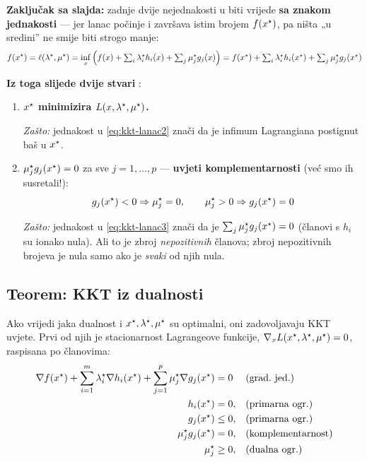 \textbf{Zaključak sa slajda:} zadnje dvije nejednakosti u biti vrijede
\textbf{sa znakom jednakosti} --- jer lanac počinje i završava istim brojem
$f(x^{\star})$, pa ništa „u sredini” ne smije biti strogo manje:
\[
f(x^{\star}) = \ell(\lambda^{\star},\mu^{\star})
= \inf_x\Big(f(x) + \textstyle\sum_i\lambda_i^{\star} h_i(x)
                  + \sum_j\mu_j^{\star} g_j(x)\Big)
= f(x^{\star}) + \textstyle\sum_i\lambda_i^{\star} h_i(x^{\star})
           + \sum_j\mu_j^{\star} g_j(x^{\star})
\]

\textbf{Iz toga slijede dvije stvari} :

\begin{enumerate}
  \item \textbf{$x^{\star}$ minimizira $L(x,\lambda^{\star},\mu^{\star})$.}

        \emph{Zašto:} jednakost u \eqref{eq:kkt-lanac2} znači da je infimum
        Lagrangiana postignut baš u $x^{\star}$.
  \item \textbf{$\mu_j^{\star} g_j(x^{\star}) = 0$} za sve $j = 1,\dots,p$ ---
        \textbf{uvjeti komplementarnosti} (već smo ih susretali!):
        \[
        g_j(x^{\star}) < 0 \Rightarrow \mu_j^{\star} = 0, \qquad
        \mu_j^{\star} > 0 \Rightarrow g_j(x^{\star}) = 0
        \]

        \emph{Zašto:} jednakost u \eqref{eq:kkt-lanac3} znači da je
        $\sum_j\mu_j^{\star} g_j(x^{\star}) = 0$ (članovi s $h_i$ su ionako nula). Ali
        to je zbroj \emph{nepozitivnih} članova; zbroj nepozitivnih brojeva je
        nula samo ako je \emph{svaki} od njih nula. \checkmark
\end{enumerate}

\subsection{Teorem: KKT iz dualnosti}

\begin{teorem}
Ako vrijedi jaka dualnost i $x^{\star}, \lambda^{\star}, \mu^{\star}$ su optimalni, oni
zadovoljavaju KKT uvjete. Prvi od njih je stacionarnost Lagrangeove funkcije,
$\nabla_x L(x^{\star},\lambda^{\star},\mu^{\star}) = 0$, raspisana po članovima:
\begin{align}
\nabla f(x^{\star}) + \sum_{i=1}^{m}\lambda_i^{\star}\nabla h_i(x^{\star})
                + \sum_{j=1}^{p}\mu_j^{\star}\nabla g_j(x^{\star}) &= 0
  && \text{(grad.\ jed.)} \notag\\
h_i(x^{\star}) &= 0, && \text{(primarna ogr.)} \notag\\
g_j(x^{\star}) &\le 0, && \text{(primarna ogr.)} \notag\\
\mu_j^{\star} g_j(x^{\star}) &= 0, && \text{(komplementarnost)} \notag\\
\mu_j^{\star} &\ge 0, && \text{(dualna ogr.)} \notag
\end{align}
\end{teorem}

